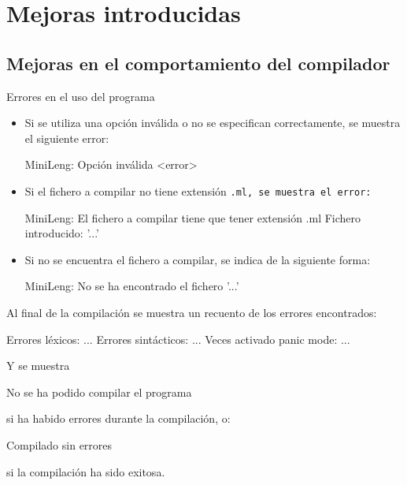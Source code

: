 \documentclass[../main.tex]{subfiles}
\begin{document}
\section{Mejoras introducidas}

\subsection{Mejoras en el comportamiento del compilador}

Errores en el uso del programa

\begin{itemize}
\item Si se utiliza una opción inválida o no se especifican correctamente, se muestra el siguiente error:
\begin{codigo}
MiniLeng: Opción inválida <error>
\end{codigo}

\item Si el fichero a compilar no tiene extensión \tt{.ml}, se muestra el error:
\begin{codigo}
MiniLeng: El fichero a compilar tiene que tener extensión .ml
          Fichero introducido: '...'
\end{codigo}

\item Si no se encuentra el fichero a compilar, se indica de la siguiente forma:
\begin{codigo}
MiniLeng: No se ha encontrado el fichero '...'
\end{codigo}

\end{itemize}

Al final de la compilación se muestra un recuento de los errores encontrados:
\begin{codigo}
Errores léxicos: ...
Errores sintácticos: ...
Veces activado panic mode: ...
\end{codigo}

Y se muestra
\begin{codigo}
No se ha podido compilar el programa
\end{codigo}
si ha habido errores durante la compilación, o:
\begin{codigo}
Compilado sin errores
\end{codigo}
si la compilación ha sido exitosa.
\end{document}
